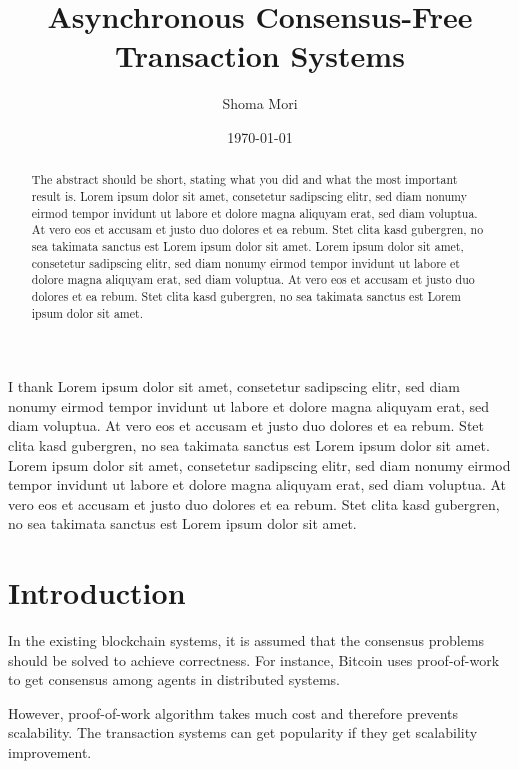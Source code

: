 \documentclass[a4paper, oneside]{discothesis}
\title{Asynchronous Consensus-Free Transaction Systems}
\author{Shoma Mori}
\institute{Distributed Computing Group \\[2pt]
Computer Engineering and Networks Laboratory \\[2pt]
ETH Zürich}
\date{\today}
\begin{document}
\frontmatter %
\maketitle

\cleardoublepage

\begin{acknowledgements}
	I thank Lorem ipsum dolor sit amet, consetetur sadipscing elitr, sed diam nonumy eirmod tempor invidunt ut labore et dolore magna aliquyam erat, sed diam voluptua. At vero eos et accusam et justo duo dolores et ea rebum. Stet clita kasd gubergren, no sea takimata sanctus est Lorem ipsum dolor sit amet. Lorem ipsum dolor sit amet, consetetur sadipscing elitr, sed diam nonumy eirmod tempor invidunt ut labore et dolore magna aliquyam erat, sed diam voluptua. At vero eos et accusam et justo duo dolores et ea rebum. Stet clita kasd gubergren, no sea takimata sanctus est Lorem ipsum dolor sit amet.
\end{acknowledgements}


\begin{abstract}
    The abstract should be short, stating what you did and what the most important result is.
	Lorem ipsum dolor sit amet, consetetur sadipscing elitr, sed diam nonumy eirmod tempor invidunt ut labore et dolore magna aliquyam erat, sed diam voluptua. At vero eos et accusam et justo duo dolores et ea rebum. Stet clita kasd gubergren, no sea takimata sanctus est Lorem ipsum dolor sit amet. Lorem ipsum dolor sit amet, consetetur sadipscing elitr, sed diam nonumy eirmod tempor invidunt ut labore et dolore magna aliquyam erat, sed diam voluptua. At vero eos et accusam et justo duo dolores et ea rebum. Stet clita kasd gubergren, no sea takimata sanctus est Lorem ipsum dolor sit amet.
\end{abstract}

\tableofcontents

\mainmatter %

\chapter{Introduction}

In the existing blockchain systems, it is assumed that the consensus problems
should be solved to achieve correctness.
For instance, Bitcoin uses proof-of-work to get consensus among agents in distributed systems.

However, proof-of-work algorithm takes much cost and therefore prevents scalability.
The transaction systems can get popularity if they get scalability improvement.
\end{document}
